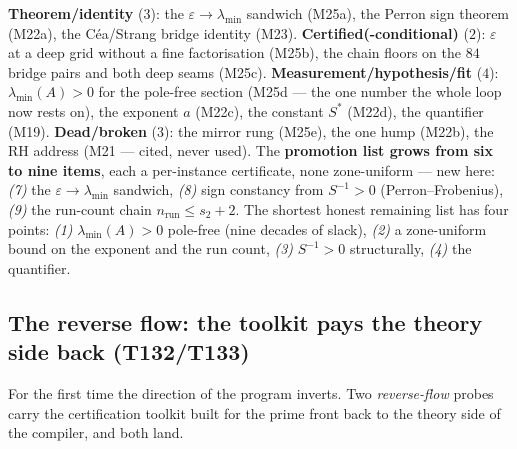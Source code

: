 \documentclass[11pt,a4paper]{article}
\begin{document}
\begin{keybox}
\textbf{Theorem/identity} ($3$): the $\varepsilon\to\lambda_{\min}$ sandwich (M25a), the
Perron sign theorem (M22a), the C\'ea/Strang bridge identity (M23).
\textbf{Certified(-conditional)} ($2$): $\varepsilon$ at a deep grid without a fine
factorisation (M25b), the chain floors on the $84$ bridge pairs and both deep seams (M25c).
\textbf{Measurement/hypothesis/fit} ($4$): $\lambda_{\min}(A)>0$ for the pole-free section
(M25d --- the one number the whole loop now rests on), the exponent $a$ (M22c), the
constant $S^{*}$ (M22d), the quantifier (M19). \textbf{Dead/broken} ($3$): the mirror rung
(M25e), the one hump (M22b), the RH address (M21 --- cited, never used). The
\textbf{promotion list grows from six to nine items}, each a per-instance certificate, none
zone-uniform --- new here: \emph{(7)} the $\varepsilon\to\lambda_{\min}$ sandwich,
\emph{(8)} sign constancy from $S^{-1}>0$ (Perron--Frobenius), \emph{(9)} the run-count
chain $n_{\mathrm{run}}\le s_{2}+2$. The shortest honest remaining list has four points:
\emph{(1)} $\lambda_{\min}(A)>0$ pole-free (nine decades of slack), \emph{(2)} a
zone-uniform bound on the exponent and the run count, \emph{(3)} $S^{-1}>0$ structurally,
\emph{(4)} the quantifier.
\end{keybox}

\subsection{The reverse flow: the toolkit pays the theory side back (T132/T133)}
For the first time the direction of the program inverts. Two \emph{reverse-flow} probes
carry the certification toolkit built for the prime front back to the theory side of the
compiler, and both land.
\end{document}
